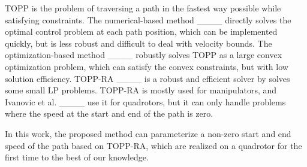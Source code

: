 TOPP is the problem of traversing a path in the fastest way possible while satisfying constraints. The numerical-based method ____ directly solves the optimal control problem at each path position, which can be implemented quickly, but is less robust and difficult to deal with velocity bounds.
The optimization-based method ____ robustly solves TOPP as a large convex optimization problem, which can satisfy the convex constraints, but with low solution efficiency.
TOPP-RA ____ is a robust and efficient solver by solves some small LP problems.
TOPP-RA is mostly used for manipulators, and Ivanovic et al. ____ use it for quadrotors, but it can only handle problems where the speed at the start and end of the path is zero. 

In this work, the proposed method can parameterize a non-zero start and end speed of the path based on TOPP-RA, which are realized on a quadrotor for the first time to the best of our knowledge.

%